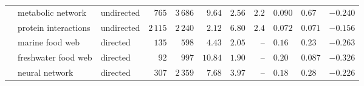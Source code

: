 \begin{center}
{\begin{tabular}{l|l|l|r|r|r|r|r|l|l|r|}
 & metabolic network         & undirected & $765$           & $3\,686$           & $9.64$  & $2.56$  & $2.2$
 & $0.090$ & $0.67$  & $-0.240$  \\
 & protein interactions      & undirected & $2\,115$        & $2\,240$           & $2.12$  & $6.80$  & $2.4$
 & $0.072$ & $0.071$ & $-0.156$  \\
 & marine food web           & directed   & $135$           & $598$              & $4.43$  & $2.05$  & --
 & $0.16$  & $0.23$  & $-0.263$  \\
 & freshwater food web       & directed   & $92$            & $997$              & $10.84$ & $1.90$  & --
 & $0.20$  & $0.087$ & $-0.326$  \\
 & neural network            & directed   & $307$           & $2\,359$           & $7.68$  & $3.97$  & --
 & $0.18$  & $0.28$  & $-0.226$  \\
\end{tabular}
}
\end{center}
\label{table:networks}
